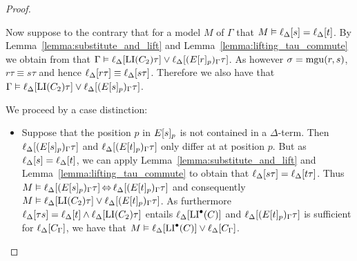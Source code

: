 \documentclass[,%
	draft=false,%
	numbers=noendperiod
	11pt,
	a4paper,
	oneside,%
	openany,
]{memoir}
\begin{document}
\begin{proof}
\begin{description}
			Now suppose to the contrary that for a model $M$ of $\Gamma$ that $M \vDash \ell_{\Delta}[s]=\ell_{\Delta}[t]$.
			By Lemma~\ref{lemma:substitute_and_lift} and  Lemma~\ref{lemma:lifting_tau_commute} we obtain from \markB{} that
			$\Gamma \vDash \ell_{\Delta}[\operatorname{LI}(C_2)\tau] \lor \ell_{\Delta}[(E{[r]_{p}})_\Gamma\tau]$.
			As however $\sigma = \operatorname{mgu}(r, s)$, $r\tau \equiv s\tau$
			and hence $\ell_{\Delta}[r\tau] \equiv \ell_{\Delta}[s\tau]$.
			Therefore we also have that 
			$\Gamma \vDash \ell_{\Delta}[\operatorname{LI}(C_2)\tau] \lor \ell_{\Delta}[(E{[s]_{p}})_\Gamma\tau]$.

			We proceed by a case distinction:
			\begin{itemize}
				\item Suppose that the position $p$ in $E{[s]_{p}}$ is not contained in a $\Delta$-term.
					Then
					$\ell_{\Delta}[(E{[s]_{p}})_\Gamma\tau]$
					and
					$\ell_{\Delta}[(E{[t]_{p}})_\Gamma\tau]$
					only differ at at position $p$.
					But as $\ell_{\Delta}[s] = \ell_{\Delta}[t]$, we can apply Lemma~\ref{lemma:substitute_and_lift} and Lemma~\ref{lemma:lifting_tau_commute} to obtain that 
					$\ell_{\Delta}[s\tau] = \ell_{\Delta}[t\tau]$.
					Thus
					$M\vDash \ell_{\Delta}[(E{[s]_{p}})_\Gamma\tau] \operatorname{\Leftrightarrow} 
					\ell_{\Delta}[(E{[t]_{p}})_\Gamma\tau]$
					and consequently
					$M \vDash \ell_{\Delta}[\operatorname{LI}(C_2)\tau] \lor \ell_{\Delta}[(E{[t]_{p}})_\Gamma\tau]$.
					As furthermore $\ell_{\Delta}[\tau s] =\ell_{\Delta}[t] \land \ell_{\Delta}[\operatorname{LI}(C_2)\tau]$ entails $\ell_{\Delta}[\operatorname{LI}^\bullet(C)]$
					and $\ell_{\Delta}[(E{[t]_{p}})_\Gamma\tau]$ is sufficient for $\ell_{\Delta}[C_\Gamma]$,
					we have that 
					$M\vDash \ell_{\Delta}[\operatorname{LI}^\bullet(C)] \lor \ell_{\Delta}[C_\Gamma]$.


			\end{itemize}






	\end{description}
\end{proof}


\end{document}
